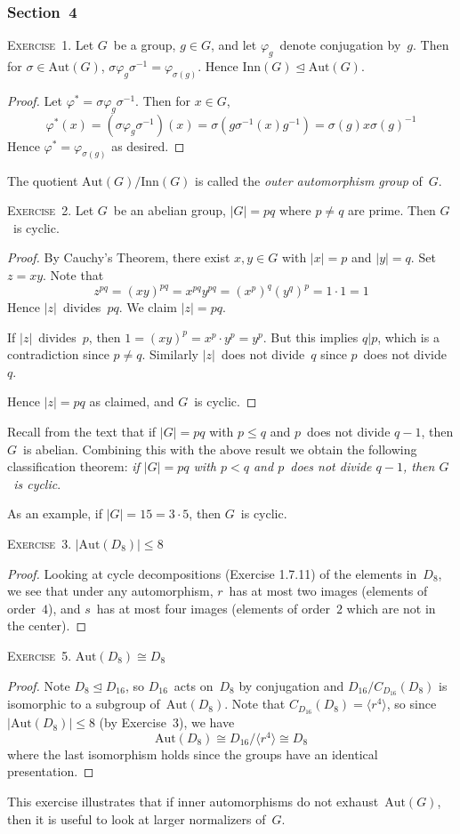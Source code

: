 \documentclass[letterpaper]{article}
\newcommand{\exercise}[1]{\goodbreak\noindent\textsc{Exercise~{#1}.}}
\newcommand{\iso}{\cong}
\newcommand{\normal}{\trianglelefteq}
\newcommand{\aut}{\mathrm{Aut}}
\newcommand{\inn}{\mathrm{Inn}}
\newcommand{\ord}[1]{|{#1}|}
\newcommand{\gen}[1]{\langle{#1}\rangle}
\begin{document}
\subsubsection*{Section~4}
\exercise{1}
Let $G$~be a group, $g\in G$, and let $\varphi_g$~denote conjugation by~$g$. Then for $\sigma\in\aut(G)$, $\sigma\varphi_g\sigma^{-1}=\varphi_{\sigma(g)}$. Hence $\inn(G)\normal\aut(G)$.
\begin{proof}
Let $\varphi^*=\sigma\varphi_g\sigma^{-1}$. Then for $x\in G$,
$$\varphi^*(x)=(\sigma\varphi_g\sigma^{-1})(x)=\sigma(g\sigma^{-1}(x)g^{-1})=\sigma(g)x\sigma(g)^{-1}$$
Hence $\varphi^*=\varphi_{\sigma(g)}$ as desired.
\end{proof}
\noindent The quotient $\aut(G)/\inn(G)$ is called the \emph{outer automorphism group} of~$G$.

\bigskip
\exercise{2}
Let $G$~be an abelian group, $\ord{G}=pq$ where $p\ne q$ are prime. Then $G$~is cyclic.
\begin{proof}
By Cauchy's Theorem, there exist $x,y\in G$ with $\ord{x}=p$ and $\ord{y}=q$. Set $z=xy$. Note that
$$z^{pq}=(xy)^{pq}=x^{pq}y^{pq}=(x^p)^q(y^q)^p=1\cdot1=1$$
Hence $\ord{z}$~divides~$pq$. We claim $\ord{z}=pq$.

If $\ord{z}$~divides~$p$, then $1=(xy)^p=x^p\cdot y^p=y^p$. But this implies $q|p$, which is a contradiction since $p\ne q$. Similarly $\ord{z}$~does not divide~$q$ since $p$~does not divide~$q$.

Hence $\ord{z}=pq$ as claimed, and $G$~is cyclic.
\end{proof}
\noindent Recall from the text that if $\ord{G}=pq$ with $p\le q$ and $p$~does not divide $q-1$, then $G$~is abelian. Combining this with the above result we obtain the following classification theorem: \emph{if $\ord{G}=pq$ with $p<q$ and $p$~does not divide $q-1$, then $G$~is cyclic}.

As an example, if $\ord{G}=15=3\cdot 5$, then $G$~is cyclic.

\bigskip

\exercise{3}
$\ord{\aut(D_8)}\le 8$
\begin{proof}
Looking at cycle decompositions (Exercise 1.7.11) of the elements in~$D_8$, we see that under any automorphism, $r$~has at most two images (elements of order~$4$), and $s$~has at most four images (elements of order~$2$ which are not in the center).
\end{proof}

\exercise{5}
$\aut(D_8)\iso D_8$
\begin{proof}
Note $D_8\normal D_{16}$, so $D_{16}$~acts on~$D_8$ by conjugation and $D_{16}/C_{D_{16}}(D_8)$ is isomorphic to a subgroup of~$\aut(D_8)$. Note that $C_{D_{16}}(D_8)=\gen{r^4}$, so since $\ord{\aut(D_8)}\le 8$ (by Exercise~3), we have
$$\aut(D_8)\iso D_{16}/\gen{r^4}\iso D_8$$
where the last isomorphism holds since the groups have an identical presentation.
\end{proof}
\noindent This exercise illustrates that if inner automorphisms do not exhaust~$\aut(G)$, then it is useful to look at larger normalizers of~$G$.
\end{document}
